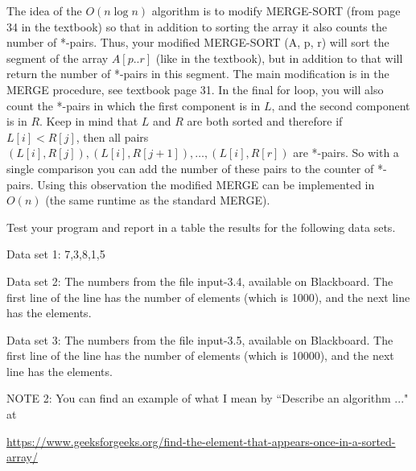 \documentclass[11pt]{article}
\begin{document}
The idea of the $O(n \log n)$  algorithm is to modify MERGE-SORT (from page 34 in the textbook)  so that in addition to sorting the array it also counts the number of *-pairs. Thus, your modified MERGE-SORT (A, p, r) will sort the segment of the array $A[p..r]$  (like in the textbook), but in addition to that will return the number of *-pairs in this segment.  The main modification is in the MERGE  procedure, see textbook page 31. In the final for loop, you will also count the *-pairs in which the first component is in $L$, and the second component is in $R$. Keep in mind that $L$ and $R$ are both sorted and therefore if $L[i] < R[j]$, then all pairs $(L[i], R[j]),  (L[i], R[j+1]), \ldots, (L[i], R[r])$ are *-pairs. So with a single comparison you can add the number of these pairs to the counter of *-pairs. Using this observation the modified MERGE can be implemented in $O(n)$ (the same runtime as the standard MERGE).
\medskip




Test your program and report in a table the results for the following data sets.

Data set 1:  7,3,8,1,5

Data set 2:  The  numbers from the file input-3.4, available on Blackboard. The first line of the line has the number of elements (which is 1000), and the next line has the elements.

Data set 3:  The  numbers from the file input-3.5, available on Blackboard. The first line of the line has the number of elements (which is 10000), and the next line has the elements.

 

 



















 
  
\bigskip


NOTE 2:  You can find an example of what I mean by  ``Describe an algorithm ..." at

\url{https://www.geeksforgeeks.org/find-the-element-that-appears-once-in-a-sorted-array/}


\end{document}
